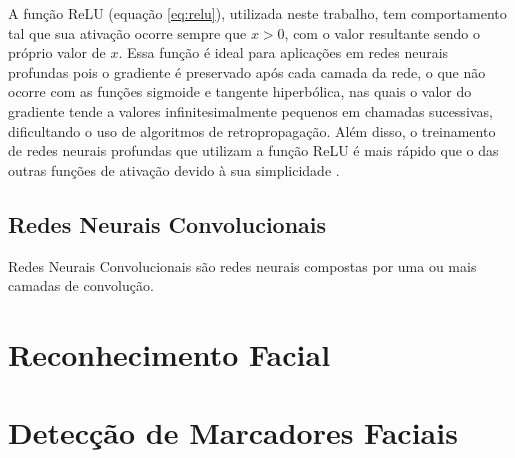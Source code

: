 A função ReLU (equação \ref{eq:relu}), utilizada neste trabalho, tem comportamento tal que sua ativação ocorre sempre que $x>0$, com o valor resultante sendo o próprio valor de $x$. 
Essa função é ideal para aplicações em redes neurais profundas pois o gradiente é preservado após cada camada da rede, o que não ocorre com as funções sigmoide e tangente hiperbólica, nas quais o valor do gradiente tende a valores infinitesimalmente pequenos em chamadas sucessivas, dificultando o uso de algoritmos de retropropagação.
Além disso, o treinamento de redes neurais profundas que utilizam a função ReLU é mais rápido que o das outras funções de ativação devido à sua simplicidade \cite{krizhevskyImageNetClassificationDeep2017}.

\subsection{Redes Neurais Convolucionais}
\label{sec:convnet}

Redes Neurais Convolucionais são redes neurais compostas por uma ou mais camadas de convolução.

\section{Reconhecimento Facial}
\label{sec:facialrecog}

\section{Detecção de Marcadores Faciais}
\label{sec:faciallm}